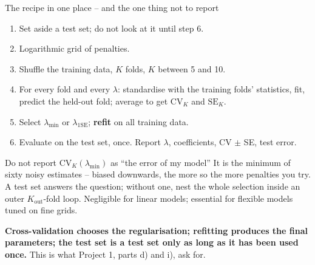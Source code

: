 \documentclass[10pt,aspectratio=169]{beamer}
\begin{document}
\begin{frame}{The recipe in one place -- and the one thing not to report}
\begin{enumerate}
  \item Set aside a test set; do not look at it until step 6.
  \item Logarithmic grid of penalties.
  \item Shuffle the training data, $K$ folds, $K$ between 5 and 10.
  \item For every fold and every $\lambda$: standardise with the training
        folds' statistics, fit, predict the held-out fold; average to get
        $\mathrm{CV}_K$ and $\mathrm{SE}_K$.
  \item Select $\lambda_{\min}$ or $\lambda_{1\mathrm{SE}}$; \textbf{refit}
        on all training data.
  \item Evaluate on the test set, once.  Report $\lambda$, coefficients,
        CV $\pm$ SE, test error.
\end{enumerate}
\vspace{2pt}
\begin{block}{Do not report $\mathrm{CV}_K(\lambda_{\min})$ as ``the error of my model''}
It is the minimum of sixty noisy estimates -- biased downwards, the more so
the more penalties you try.  A test set answers the question; without one,
nest the whole selection inside an outer $K_{\mathrm{out}}$-fold loop.
Negligible for linear models; essential for flexible models tuned on fine
grids.
\end{block}
\vspace{2pt}
\centering\small
\textbf{Cross-validation chooses the regularisation; refitting produces the
final parameters; the test set is a test set only as long as it has been used
once.}  This is what Project 1, parts d) and i), ask for.
\end{frame}

\end{document}
